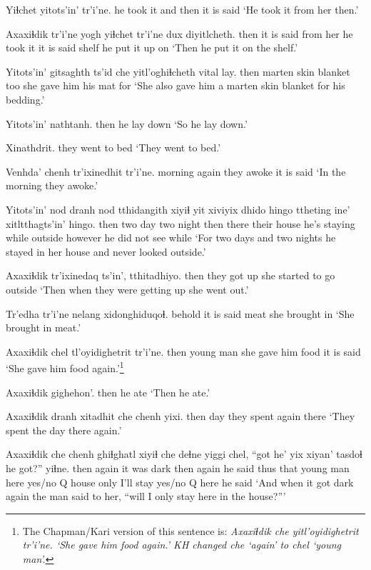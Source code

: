 \documentclass[12pt]{article}
\begin{document}
\gll Yiɬchet yitots'in' tr'i'ne.
{he took it} {and then} {it is said}
\glt `He took it from her then.'
\glend

\gll Axaxiɬdik tr'i'ne yogh yiɬchet tr'i'ne dux diyitlcheth.
then  {it is said} {from her} {he took it} {it is said} shelf {he put it up on}
\glt `Then he put it on the shelf.'
\glend

\gll Yitots'in' gitsaghth ts'id  che yitl'oghiɬcheth vital  lay.
then  {marten skin} blanket  too {she gave him}  {his mat}  for
\glt `She also gave him a marten skin blanket for his bedding.'
\glend

\gll Yitots'in' nathtanh.
then  {he lay down}
\glt `So he lay down.'
\glend

\gll Xinathdrit.
{{they went to bed}}
\glt `They went to bed.'
\glend

\gll Venhda' chenh tr'ixinedhit tr'i'ne.
morning again {they awoke} {it is said}
\glt `In the morning they awoke.'
\glend

\gll Yitots'in' nod dranh nod tthidangith xiyiɬ  yit xiviyix  dhido hingo ttheting ine'  xitltthagts'in' hingo.
then  two day  two night  then there {their house} {he's staying} while outside however {he did not see}  while
\glt `For two days and two nights he stayed in her house and never looked outside.'
\glend

\gll Axaxiɬdik tr'ixinedaq ts'in',  tthitadhiyo.
then  {they got up} {} {she started to go outside}
\glt `Then when they were getting up she went out.'
\glend

\gll Tr'edha tr'i'ne nelang xidonghiduqoɬ.
behold  {it is said} meat  {she brought in}
\glt `She brought in meat.'
\glend

\gll Axaxiɬdik chel tl'oyidighetrit tr'i'ne.
then  {young man} {she gave him food} {it is said}
\glt `She gave him food again.'\footnote{The Chapman/Kari version of this sentence is: \em Axaxiɬdik che yitl'oyidighetrit tr'i'ne. \em `She gave him food again.' KH changed \em che \em `again' to \em chel \em `young man'.}
\glend

\gll Axaxiɬdik gighehon'.
then  {he ate}
\glt `Then he ate.'
\glend

\gll Axaxiɬdik dranh xitadhit {che chenh} yixi.
then  day  {they spent} again there 
\glt `They spent the day there again.'
\glend

\gll Axaxiɬdik {che chenh}  ghiɬghatl xiyiɬ che deɬne  yiggi chel, ``got he' yix xiyan' tasdoɬ he got?'' yiɬne.
then   again  {it was dark} then again {he said thus} that  {young man} here {yes/no Q} house only {I'll stay} {yes/no Q} here {he said}
\glt `And when it got dark again the man said to her, ``will I only stay here in the house?'''
\glend
\end{document}
